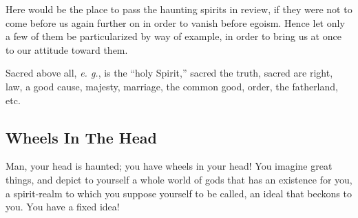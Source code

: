 \documentclass[12pt,a4paper]{book}
\begin{document}
Here would be the place to pass the haunting spirits in review, if they were 
not to come before us again further on in order to vanish before egoism. Hence 
let only a few of them be particularized by way of example, in order to bring 
us at once to our attitude toward them.

Sacred above all, \textit{e. g.}, is the ``holy Spirit,'' sacred the truth, 
sacred are right, law, a good cause, majesty, marriage, the common good, 
order, the fatherland, etc.

\subsection[Wheels In The Head]{\centering Wheels In The Head}

Man, your head is haunted; you have wheels in your head! You imagine great 
things, and depict to yourself a whole world of gods that has an existence for 
you, a spirit-realm to which you suppose yourself to be called, an ideal that 
beckons to you. You have a fixed idea!
\end{document}
